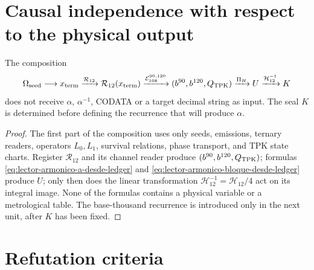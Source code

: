 \section{Causal independence with respect to the physical output}

\begin{theorem}
\label{thm:aislamiento-u-k-alpha-codata}
The composition
\begin{equation}
 \Omega_{\rm seed}\longrightarrow x_{\rm term}
 \xrightarrow{\mathcal R_{12}}
 \mathcal R_{12}(x_{\rm term})
 \xrightarrow{\mathcal E_{108}^{90,120}}
 (b^{90},b^{120},Q_{\rm TPK})
 \xrightarrow{\Pi_H}U
 \xrightarrow{\mathcal H_{12}^{-1}}K
 \label{eq:composicion-upstream-u-k}
\end{equation}
does not receive \(\alpha\), \(\alpha^{-1}\), CODATA or a target decimal
string as input. The seal \(K\) is determined before defining the
recurrence that will produce \(\alpha\).
\end{theorem}

\begin{proof}
The first part of the composition uses only seeds, emissions, ternary readers, operators \(L_0,L_1\), survival relations, phase transport, and TPK state charts. Register \(\mathcal R_{12}\) and its channel reader produce \((b^{90},b^{120},Q_{\rm TPK})\); formulas \eqref{eq:lector-armonico-a-desde-ledger} and \eqref{eq:lector-armonico-bloque-desde-ledger} produce \(U\); only then does the linear transformation \(\mathcal H_{12}^{-1}=\mathcal H_{12}/4\) act on its integral image. None of the formulas contains a physical variable or a metrological table. The base-thousand recurrence is introduced only in the next unit, after \(K\) has been fixed.
\end{proof}

\section{Refutation criteria}

